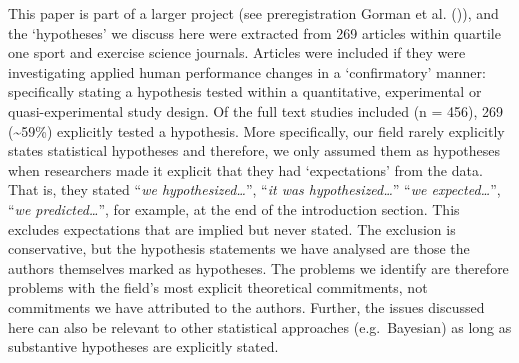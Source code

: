 \documentclass[
]{article}
\begin{document}
This paper is part of a larger project (see preregistration Gorman et
al. ()), and the `hypotheses' we discuss
here were extracted from 269 articles within quartile one sport and
exercise science journals. Articles were included if they were
investigating applied human performance changes in a `confirmatory'
manner: specifically stating a hypothesis tested within a quantitative,
experimental or quasi-experimental study design. Of the full text
studies included (n = 456), 269 (\textasciitilde59\%) explicitly tested
a hypothesis. More specifically, our field rarely explicitly states
statistical hypotheses and therefore, we only assumed them as hypotheses
when researchers made it explicit that they had `expectations' from the
data. That is, they stated ``\emph{we hypothesized\ldots{}}'',
``\emph{it was hypothesized\ldots{}}'' ``\emph{we expected\ldots{}}'',
``\emph{we predicted\ldots{}}'', for example, at the end of the
introduction section. This excludes expectations that are implied but
never stated. The exclusion is conservative, but the hypothesis
statements we have analysed are those the authors themselves marked as
hypotheses. The problems we identify are therefore problems with the
field's most explicit theoretical commitments, not commitments we have
attributed to the authors. Further, the issues discussed here can also
be relevant to other statistical approaches (e.g.~Bayesian) as long as
substantive hypotheses are explicitly stated.
\end{document}
